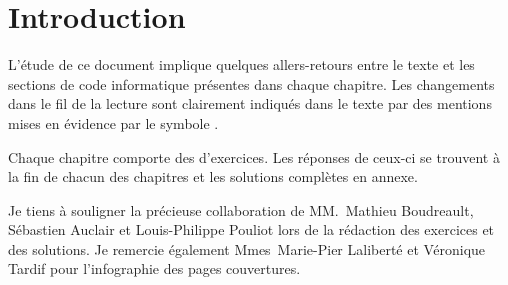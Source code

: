 \chapter*{Introduction}


L'étude de ce document implique quelques allers-retours entre le texte
et les sections de code informatique présentes dans chaque chapitre.
Les changements dans le fil de la lecture sont clairement indiqués
dans le texte par des mentions mises en évidence par le symbole
{\color{darkred}\noway}.

Chaque chapitre comporte des d'exercices. Les réponses de ceux-ci se
trouvent à la fin de chacun des chapitres et les solutions complètes
en annexe.

Je tiens à souligner la précieuse collaboration de MM.~Mathieu
Boudreault, Sébastien Auclair et Louis-Philippe Pouliot lors de la
rédaction des exercices et des solutions. Je remercie également
Mmes~Marie-Pier Laliberté et Véronique Tardif pour l'infographie des
pages couvertures.


